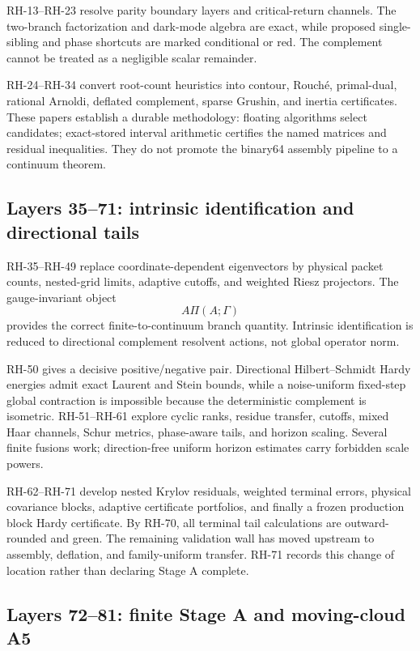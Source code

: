 \documentclass[11pt]{article}
\theoremstyle{definition}
\theoremstyle{remark}
\begin{document}
RH-13--RH-23 resolve parity boundary layers and critical-return channels.
The two-branch factorization and dark-mode algebra are exact, while proposed
single-sibling and phase shortcuts are marked conditional or red.  The
complement cannot be treated as a negligible scalar remainder.

RH-24--RH-34 convert root-count heuristics into contour, Rouch\'e,
primal-dual, rational Arnoldi, deflated complement, sparse Grushin, and inertia
certificates.  These papers establish a durable methodology: floating
algorithms select candidates; exact-stored interval arithmetic certifies the
named matrices and residual inequalities.  They do not promote the binary64
assembly pipeline to a continuum theorem.

\subsection{Layers 35--71: intrinsic identification and directional tails}

RH-35--RH-49 replace coordinate-dependent eigenvectors by physical packet
counts, nested-grid limits, adaptive cutoffs, and weighted Riesz projectors.
The gauge-invariant object
\[
 A\Pi(A;\Gamma)
\]
provides the correct finite-to-continuum branch quantity.  Intrinsic
identification is reduced to directional complement resolvent actions, not
global operator norm.

RH-50 gives a decisive positive/negative pair.  Directional
Hilbert--Schmidt Hardy energies admit exact Laurent and Stein bounds, while a
noise-uniform fixed-step global contraction is impossible because the
deterministic complement is isometric.  RH-51--RH-61 explore cyclic ranks,
residue transfer, cutoffs, mixed Haar channels, Schur metrics, phase-aware
tails, and horizon scaling.  Several finite fusions work; direction-free
uniform horizon estimates carry forbidden scale powers.

RH-62--RH-71 develop nested Krylov residuals, weighted terminal errors,
physical covariance blocks, adaptive certificate portfolios, and finally a
frozen production block Hardy certificate.  By RH-70, all terminal tail
calculations are outward-rounded and green.  The remaining validation wall
has moved upstream to assembly, deflation, and family-uniform transfer.  RH-71
records this change of location rather than declaring Stage A complete.

\subsection{Layers 72--81: finite Stage A and moving-cloud A5}
\end{document}
